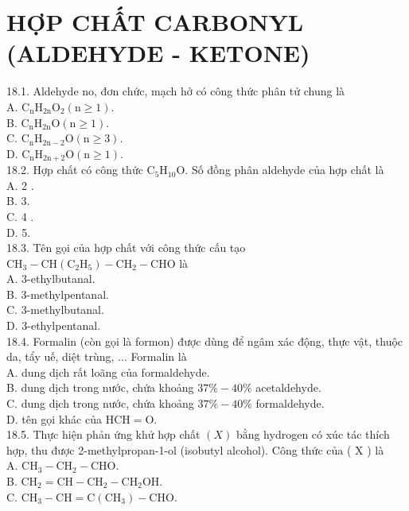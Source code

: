 \documentclass[10pt]{article}
\begin{document}
\section*{HỢP CHẤT CARBONYL (ALDEHYDE - KETONE)}
18.1. Aldehyde no, đơn chức, mạch hở có công thức phân tử chung là\\
A. $\mathrm{C}_{\mathrm{n}} \mathrm{H}_{2 \mathrm{n}} \mathrm{O}_{2}(\mathrm{n} \geq 1)$.\\
B. $\mathrm{C}_{\mathrm{n}} \mathrm{H}_{2 \mathrm{n}} \mathrm{O}(\mathrm{n} \geq 1)$.\\
C. $\mathrm{C}_{\mathrm{n}} \mathrm{H}_{2 \mathrm{n}-2} \mathrm{O}(\mathrm{n} \geq 3)$.\\
D. $\mathrm{C}_{\mathrm{n}} \mathrm{H}_{2 \mathrm{n}+2} \mathrm{O}(\mathrm{n} \geq 1)$.\\
18.2. Hợp chất có công thức $\mathrm{C}_{5} \mathrm{H}_{10} \mathrm{O}$. Số đồng phân aldehyde của hợp chất là\\
A. 2 .\\
B. 3.\\
C. 4 .\\
D. 5.\\
18.3. Tên gọi của hợp chất với công thức cấu tạo $\mathrm{CH}_{3}-\mathrm{CH}\left(\mathrm{C}_{2} \mathrm{H}_{5}\right)-\mathrm{CH}_{2}-\mathrm{CHO}$ là\\
A. 3-ethylbutanal.\\
B. 3-methylpentanal.\\
C. 3-methylbutanal.\\
D. 3-ethylpentanal.\\
18.4. Formalin (còn gọi là formon) được dùng để ngâm xác động, thực vật, thuộc da, tẩy uế, diệt trùng, ... Formalin là\\
A. dung dịch rất loãng của formaldehyde.\\
B. dung dịch trong nước, chứa khoảng $37 \%-40 \%$ acetaldehyde.\\
C. dung dịch trong nước, chứa khoảng $37 \%-40 \%$ formaldehyde.\\
D. tên gọi khác của $\mathrm{HCH}=\mathrm{O}$.\\
18.5. Thực hiện phản ứng khử hợp chất $(X)$ bằng hydrogen có xúc tác thích hợp, thu được 2-methylpropan-1-ol (isobutyl alcohol). Công thức của ( X ) là\\
A. $\mathrm{CH}_{3}-\mathrm{CH}_{2}-\mathrm{CHO}$.\\
B. $\mathrm{CH}_{2}=\mathrm{CH}-\mathrm{CH}_{2}-\mathrm{CH}_{2} \mathrm{OH}$.\\
C. $\mathrm{CH}_{3}-\mathrm{CH}=\mathrm{C}\left(\mathrm{CH}_{3}\right)-\mathrm{CHO}$.\\
\end{document}
